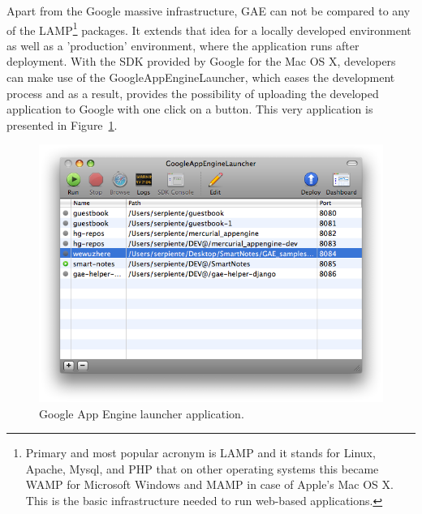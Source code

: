 Apart from the Google massive infrastructure, GAE can not be compared to any of the LAMP\footnote{Primary and most popular acronym is LAMP and it stands for Linux, Apache, Mysql, and PHP that on other operating systems this became WAMP for Microsoft Windows and MAMP in case of Apple's Mac OS X. This is the basic infrastructure needed to run web-based applications.} packages. It extends that idea for a locally developed environment as well as a 'production' environment, where the application runs after deployment. With the SDK provided by Google for the Mac OS X, developers can make use of the GoogleAppEngineLauncher, which eases the development process and as a result, provides the possibility of uploading the developed application to Google with one click on a button. This very application is presented in Figure~\ref{gae_launcher}.
\begin{figure}[h]
\begin{center}
\includegraphics[scale=0.4]{img/gae_launcher.png}
\caption{Google App Engine launcher application.}
\label{gae_launcher}
\end{center}
\end{figure}

